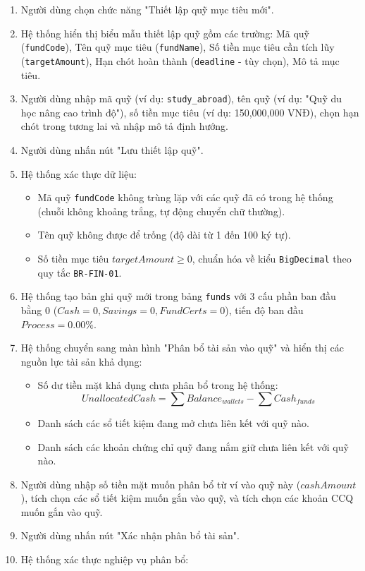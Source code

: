 \documentclass[11pt,a4paper]{article}
\providecommand{\tightlist}{
  \setlength{\itemsep}{0pt}\setlength{\parskip}{0pt}}
\begin{document}
\begin{itemize}
  \begin{enumerate}
  \def\labelenumi{\arabic{enumi}.}
  \tightlist
  \item
    Người dùng chọn chức năng "Thiết lập quỹ mục tiêu mới".
  \item
    Hệ thống hiển thị biểu mẫu thiết lập quỹ gồm các trường: Mã quỹ
    (\texttt{fundCode}), Tên quỹ mục tiêu (\texttt{fundName}), Số tiền
    mục tiêu cần tích lũy (\texttt{targetAmount}), Hạn chót hoàn thành
    (\texttt{deadline} - tùy chọn), Mô tả mục tiêu.
  \item
    Người dùng nhập mã quỹ (ví dụ: \texttt{study\_abroad}), tên quỹ (ví
    dụ: "Quỹ du học nâng cao trình độ"), số tiền mục tiêu (ví dụ:
    150,000,000 VNĐ), chọn hạn chót trong tương lai và nhập mô tả định
    hướng.
  \item
    Người dùng nhấn nút "Lưu thiết lập quỹ".
  \item
    Hệ thống xác thực dữ liệu:

    \begin{itemize}
    \tightlist
    \item
      Mã quỹ \texttt{fundCode} không trùng lặp với các quỹ đã có trong
      hệ thống (chuỗi không khoảng trắng, tự động chuyển chữ thường).
    \item
      Tên quỹ không được để trống (độ dài từ 1 đến 100 ký tự).
    \item
      Số tiền mục tiêu \(targetAmount \ge 0\), chuẩn hóa về kiểu
      \texttt{BigDecimal} theo quy tắc \texttt{BR-FIN-01}.
    \end{itemize}
  \item
    Hệ thống tạo bản ghi quỹ mới trong bảng \texttt{funds} với 3 cấu
    phần ban đầu bằng 0 (\(Cash = 0, Savings = 0, FundCerts = 0\)), tiến
    độ ban đầu \(Process = 0.00\%\).
  \item
    Hệ thống chuyển sang màn hình "Phân bổ tài sản vào quỹ" và hiển thị
    các nguồn lực tài sản khả dụng:

    \begin{itemize}
    \tightlist
    \item
      Số dư tiền mặt khả dụng chưa phân bổ trong hệ thống:
      \[
      UnallocatedCash = \sum Balance_{wallets} - \sum Cash_{funds}
      \]
    \item
      Danh sách các sổ tiết kiệm đang mở chưa liên kết với quỹ nào.
    \item
      Danh sách các khoản chứng chỉ quỹ đang nắm giữ chưa liên kết với
      quỹ nào.
    \end{itemize}
  \item
    Người dùng nhập số tiền mặt muốn phân bổ từ ví vào quỹ này
    (\(cashAmount\)), tích chọn các sổ tiết kiệm muốn gắn vào quỹ, và
    tích chọn các khoản CCQ muốn gắn vào quỹ.
  \item
    Người dùng nhấn nút "Xác nhận phân bổ tài sản".
  \item
    Hệ thống xác thực nghiệp vụ phân bổ:


\end{enumerate}
\end{itemize}
\end{document}
